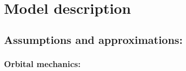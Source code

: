 \documentclass[11pt]{article}
\begin{document}
\section{Model description}
\subsection{Assumptions and approximations:}
\subsubsection{Orbital mechanics:}




\end{document}
